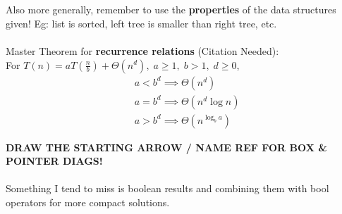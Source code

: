 \documentclass[a4paper]{article} \usepackage[backend=biber, style=numeric, sorting=none]{biblatex}
\begin{document}
\begin{multicols*}{4}
\\ \\
Also more generally, remember to use the \textbf{properties} of the data structures given! Eg: list is sorted, left tree is smaller than right tree, etc. 
\\ \\
Master Theorem for \textbf{recurrence relations} (Citation Needed): \\
For $T(n) = aT(\frac{n}{b}) + \Theta({n^d}), \; a \geq 1, \; b >  1, \; d \geq 0$,
\begin{align*}
& a < b^d \implies \Theta(n^d) \\
& a = b^d \implies \Theta(n^d \log n) \\
& a > b^d \implies \Theta(n^{\log_b a})
\end{align*}

{\textbf{DRAW THE STARTING ARROW / NAME REF FOR BOX \& POINTER DIAGS!}} 
\\ \\ 
Something I tend to miss is boolean results and combining them with bool operators for more compact solutions. 

\end{multicols*}
\end{document}
